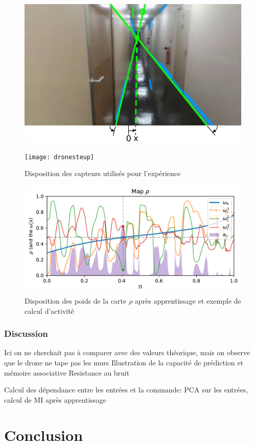 \documentclass[../main]{subfiles}
\begin{document}
\begin{figure}
\begin{minipage}{0.5\textwidth}
\includegraphics[width=\textwidth]{visudrone}
\end{minipage}
\begin{minipage}{0.5\textwidth}
\texttt{[image: dronesteup]}
\end{minipage}
\caption{Disposition des capteurs utilisés pour l'expérience}
\label{fig:drone}
\end{figure}

\begin{figure}
\includegraphics[width=\textwidth]{dronemap}
\caption{Disposition des poids de la carte $\rho$ après apprentissage et exemple de calcul d'activité}
\label{fig:drone_w}
\end{figure}

\subsubsection{Discussion}
Ici on ne cherchait pas à comparer avec des valeurs théorique, mais on observe que le drone ne tape pas les murs
Illustration de la capacité de prédiction et mémoire associative
Resistance au bruit

Calcul des dépendance entre les entrées et la commande:
PCA sur les entrées, calcul de MI après apprentissage

\section{Conclusion}


\ifSubfilesClassLoaded{
    \printbibliography
}{}
\end{document}
